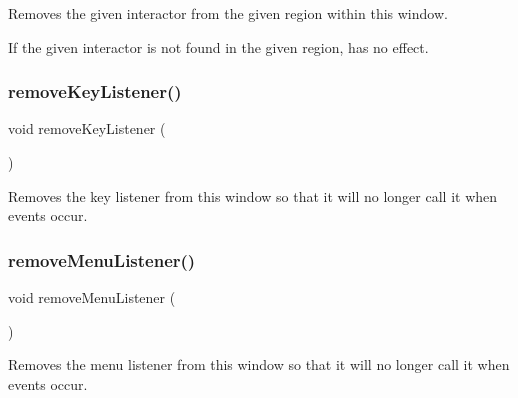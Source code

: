 Removes the given interactor from the given region within this window. 

If the given interactor is not found in the given region, has no effect. \mbox{\label{classsgl_1_1GWindow_a43095f41cab3be732b49f29970484b05}} 
\subsubsection{\texorpdfstring{remove\+Key\+Listener()}{removeKeyListener()}}
{\footnotesize\ttfamily void remove\+Key\+Listener (\begin{DoxyParamCaption}{ }\end{DoxyParamCaption})\hspace{0.3cm}{\ttfamily [virtual]}}



Removes the key listener from this window so that it will no longer call it when events occur. 

\mbox{\label{classsgl_1_1GWindow_a718d186fa807d6dec721c3b6f0c4309a}} 
\subsubsection{\texorpdfstring{remove\+Menu\+Listener()}{removeMenuListener()}}
{\footnotesize\ttfamily void remove\+Menu\+Listener (\begin{DoxyParamCaption}{ }\end{DoxyParamCaption})\hspace{0.3cm}{\ttfamily [virtual]}}



Removes the menu listener from this window so that it will no longer call it when events occur. 

\mbox{\label{classsgl_1_1GWindow_aff47f71ce47e688a07c9d38dc92fcc11}} 
